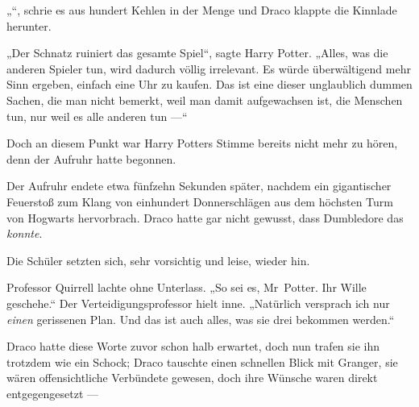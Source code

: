 „“, schrie es aus hundert Kehlen in der Menge und Draco klappte die Kinnlade herunter.

„Der Schnatz ruiniert das gesamte Spiel“, sagte Harry Potter.
„Alles, was die anderen Spieler tun, wird dadurch völlig irrelevant. Es würde überwältigend mehr Sinn ergeben, einfach eine Uhr zu kaufen. Das ist eine dieser unglaublich dummen Sachen, die man nicht bemerkt, weil man damit aufgewachsen ist, die Menschen tun, nur weil es alle anderen tun —“

Doch an diesem Punkt war Harry Potters Stimme bereits nicht mehr zu hören, denn der Aufruhr hatte begonnen.

\later

Der Aufruhr endete etwa fünfzehn Sekunden später, nachdem ein gigantischer Feuerstoß zum Klang von einhundert Donnerschlägen aus dem höchsten Turm von Hogwarts hervorbrach. Draco hatte gar nicht gewusst, dass Dumbledore das \emph{konnte}.

Die Schüler setzten sich, sehr vorsichtig und leise, wieder hin.

Professor Quirrell lachte ohne Unterlass.
„So sei es, Mr~Potter. Ihr Wille geschehe.“ Der Verteidigungsprofessor hielt inne.
„Natürlich versprach ich nur \emph{einen} gerissenen Plan. Und das ist auch alles, was sie drei bekommen werden.“

Draco hatte diese Worte zuvor schon halb erwartet, doch nun trafen sie ihn trotzdem wie ein Schock; Draco tauschte einen schnellen Blick mit Granger, sie wären offensichtliche Verbündete gewesen, doch ihre Wünsche waren direkt entgegengesetzt —

